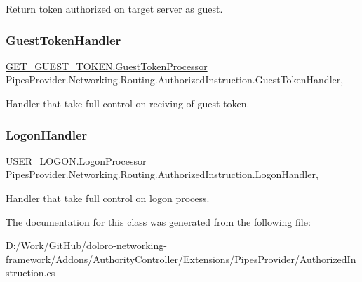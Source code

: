 Return token authorized on target server as guest. 

\mbox{\label{class_pipes_provider_1_1_networking_1_1_routing_1_1_authorized_instruction_a69c5e303ece339342c6979ba11436d82}} 
\subsubsection{\texorpdfstring{Guest\+Token\+Handler}{GuestTokenHandler}}
{\footnotesize\ttfamily \mbox{\hyperlink{class_authority_controller_1_1_queries_1_1_g_e_t___g_u_e_s_t___t_o_k_e_n_1_1_guest_token_processor}{G\+E\+T\+\_\+\+G\+U\+E\+S\+T\+\_\+\+T\+O\+K\+E\+N.\+Guest\+Token\+Processor}} Pipes\+Provider.\+Networking.\+Routing.\+Authorized\+Instruction.\+Guest\+Token\+Handler\hspace{0.3cm}{\ttfamily [get]}, {\ttfamily [private]}}



Handler that take full control on reciving of guest token. 

\mbox{\label{class_pipes_provider_1_1_networking_1_1_routing_1_1_authorized_instruction_a9f1721ee3d1fbb3803b77a991f5e1a03}} 
\subsubsection{\texorpdfstring{Logon\+Handler}{LogonHandler}}
{\footnotesize\ttfamily \mbox{\hyperlink{class_authority_controller_1_1_queries_1_1_u_s_e_r___l_o_g_o_n_1_1_logon_processor}{U\+S\+E\+R\+\_\+\+L\+O\+G\+O\+N.\+Logon\+Processor}} Pipes\+Provider.\+Networking.\+Routing.\+Authorized\+Instruction.\+Logon\+Handler\hspace{0.3cm}{\ttfamily [get]}, {\ttfamily [private]}}



Handler that take full control on logon process. 



The documentation for this class was generated from the following file\+:\begin{DoxyCompactItemize}
\item 
D\+:/\+Work/\+Git\+Hub/doloro-\/networking-\/framework/\+Addons/\+Authority\+Controller/\+Extensions/\+Pipes\+Provider/Authorized\+Instruction.\+cs\end{DoxyCompactItemize}
